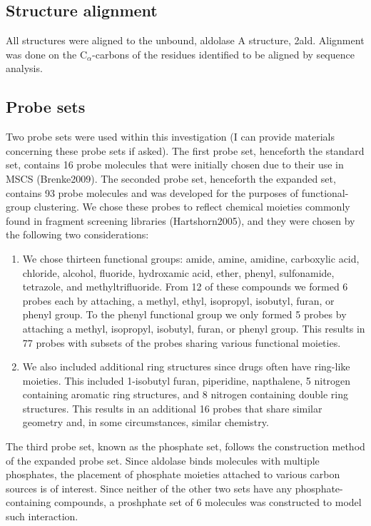 \documentclass[11pt,a4paper]{article}
\begin{document}
\subsection{Structure alignment}
	All structures were aligned to the unbound, aldolase A structure, 2ald.  Alignment was done on the $\mathrm{C}_\alpha$-carbons of the residues identified
	to be aligned by sequence analysis. 

\subsection{Probe sets}
Two probe sets were used within this investigation (I can provide materials concerning
these probe sets if asked).  The 
first probe set, henceforth the standard set, contains 16 probe molecules that were
initially chosen due to their use in MSCS (Brenke2009).  The seconded probe set,
henceforth the expanded set, contains 93 probe molecules and was developed for the 
purposes of functional-group clustering.  We chose these probes to reflect chemical
moieties commonly found in fragment screening libraries (Hartshorn2005), and
they were chosen by the following two considerations:
\begin{enumerate}
  \item We chose thirteen functional groups: amide, amine, amidine, carboxylic acid, chloride,
    alcohol, fluoride, hydroxamic acid, ether, phenyl, sulfonamide, tetrazole,
    and methyltrifluoride.  From 12 of these compounds we formed 6 probes each by 
    attaching, a methyl, ethyl, isopropyl, isobutyl, furan, or phenyl group.  To the 
    phenyl functional group we only formed 5 probes by attaching a methyl, isopropyl, 
    isobutyl, furan, or phenyl group.  This results in 77 probes with subsets of the probes
    sharing various functional moieties.
  \item We also included additional ring structures since drugs often have ring-like
    moieties.  This included 1-isobutyl
    furan, piperidine, napthalene, 5 nitrogen containing aromatic ring structures, and
    8 nitrogen containing double ring structures.  This results in an additional 16 probes
    that share similar geometry and, in some circumstances, similar chemistry.
\end{enumerate}
The third probe set, known as the phosphate set, follows the construction method of the expanded probe set.
Since aldolase binds molecules with multiple phosphates, the placement of phosphate moieties attached to
various carbon sources is of interest.  Since neither of the other two sets have any phosphate-containing
compounds, a proshphate set of 6 molecules was constructed to model such interaction.
\end{document}
